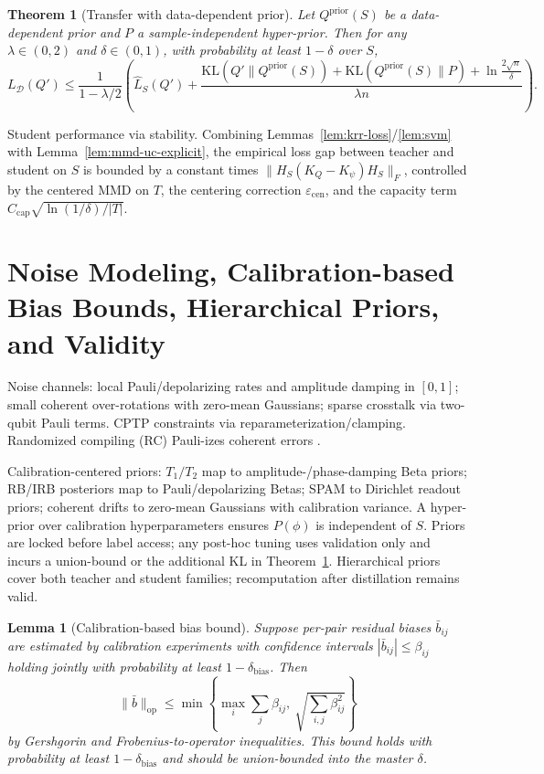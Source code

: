 \documentclass{article}
\newtheorem{theorem}{Theorem}
\newtheorem{lemma}{Lemma}
\begin{document}
\begin{theorem}[Transfer with data-dependent prior]\label{thm:transfer-ddp}
Let $Q^{\mathrm{prior}}(S)$ be a data-dependent prior and $P$ a sample-independent hyper-prior. Then for any $\lambda\in(0,2)$ and $\delta\in(0,1)$, with probability at least $1-\delta$ over $S$,
\[
L_\mathcal{D}(Q') \le \frac{1}{1-\lambda/2}\left(\hat{L}_S(Q') + \frac{\mathrm{KL}(Q'\|Q^{\mathrm{prior}}(S))+\mathrm{KL}(Q^{\mathrm{prior}}(S)\|P)+\ln\frac{2\sqrt{n}}{\delta}}{\lambda n}\right).
\]
\end{theorem}

Student performance via stability. Combining Lemmas~\ref{lem:krr-loss}/\ref{lem:svm} with Lemma~\ref{lem:mmd-uc-explicit}, the empirical loss gap between teacher and student on $S$ is bounded by a constant times $\|H_S (K_Q-K_\psi) H_S\|_{F}$, controlled by the centered MMD on $T$, the centering correction $\varepsilon_{\mathrm{cen}}$, and the capacity term $C_{\mathrm{cap}}\sqrt{\ln(1/\delta)/|T|}$.

\section{Noise Modeling, Calibration-based Bias Bounds, Hierarchical Priors, and Validity}\label{sec:noise-prior}
Noise channels: local Pauli/depolarizing rates and amplitude damping in $[0,1]$; small coherent over-rotations with zero-mean Gaussians; sparse crosstalk via two-qubit Pauli terms. CPTP constraints via reparameterization/clamping. Randomized compiling (RC) Pauli-izes coherent errors \cite{wallman2016noise, hashim2021randomized}.

Calibration-centered priors: $T_1/T_2$ map to amplitude-/phase-damping Beta priors; RB/IRB posteriors map to Pauli/depolarizing Betas; SPAM to Dirichlet readout priors; coherent drifts to zero-mean Gaussians with calibration variance. A hyper-prior over calibration hyperparameters ensures $P(\phi)$ is independent of $S$. Priors are locked before label access; any post-hoc tuning uses validation only and incurs a union-bound or the additional KL in Theorem~\ref{thm:transfer-ddp}. Hierarchical priors cover both teacher and student families; recomputation after distillation remains valid.

\begin{lemma}[Calibration-based bias bound]\label{lem:bias-calib}
Suppose per-pair residual biases $\bar{b}_{ij}$ are estimated by calibration experiments with confidence intervals $|\bar{b}_{ij}|\le \beta_{ij}$ holding jointly with probability at least $1-\delta_{\mathrm{bias}}$. Then
\[
\|\bar{b}\|_{\mathrm{op}} \le \min\left\{\max_i \sum_j \beta_{ij},\ \sqrt{\sum_{i,j}\beta_{ij}^2}\right\}
\]
by Gershgorin and Frobenius-to-operator inequalities. This bound holds with probability at least $1-\delta_{\mathrm{bias}}$ and should be union-bounded into the master $\delta$.
\end{lemma}
\end{document}
